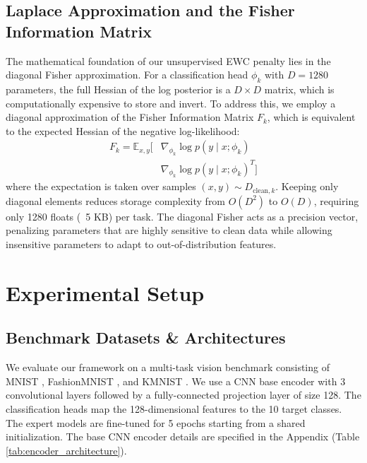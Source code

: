 \documentclass{article}
\theoremstyle{plain}
\theoremstyle{definition}
\theoremstyle{remark}
\begin{document}
\subsection{Laplace Approximation and the Fisher Information Matrix}
The mathematical foundation of our unsupervised EWC penalty lies in the diagonal Fisher approximation. For a classification head $\phi_k$ with $D = 1280$ parameters, the full Hessian of the log posterior is a $D \times D$ matrix, which is computationally expensive to store and invert. To address this, we employ a diagonal approximation of the Fisher Information Matrix $F_k$, which is equivalent to the expected Hessian of the negative log-likelihood:
\begin{equation}
\begin{split}
    F_k = \mathbb{E}_{x, y} \big[ & \nabla_{\phi_k} \log p(y \mid x; \phi_k) \\
    & \nabla_{\phi_k} \log p(y \mid x; \phi_k)^T \big]
\end{split}
\end{equation}
where the expectation is taken over samples $(x, y) \sim D_{\text{clean}, k}$. Keeping only diagonal elements reduces storage complexity from $O(D^2)$ to $O(D)$, requiring only 1280 floats (~5 KB) per task. The diagonal Fisher acts as a precision vector, penalizing parameters that are highly sensitive to clean data while allowing insensitive parameters to adapt to out-of-distribution features.

\section{Experimental Setup}
\subsection{Benchmark Datasets \& Architectures}
We evaluate our framework on a multi-task vision benchmark consisting of MNIST \cite{LeCun89}, FashionMNIST \cite{Fashion97}, and KMNIST \cite{Kmnist18}. We use a CNN base encoder with 3 convolutional layers followed by a fully-connected projection layer of size 128. The classification heads map the 128-dimensional features to the 10 target classes. The expert models are fine-tuned for 5 epochs starting from a shared initialization. The base CNN encoder details are specified in the Appendix (Table \ref{tab:encoder_architecture}).
\end{document}
